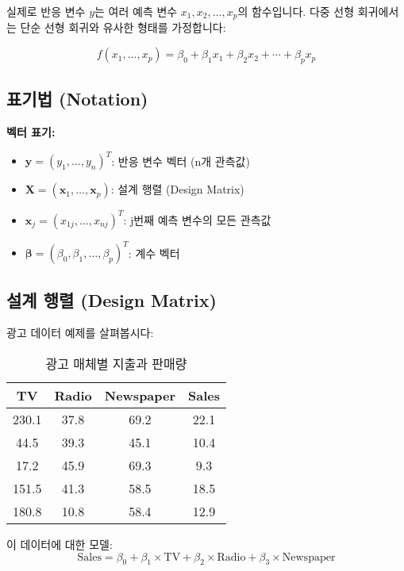 \documentclass[12pt]{article}
\begin{document}
실제로 반응 변수 $y$는 여러 예측 변수 $x_1, x_2, \ldots, x_p$의 함수입니다. 다중 선형 회귀에서는 단순 선형 회귀와 유사한 형태를 가정합니다:

\begin{equation}
f(x_1, \ldots, x_p) = \beta_0 + \beta_1 x_1 + \beta_2 x_2 + \cdots + \beta_p x_p
\end{equation}

\subsection{표기법 (Notation)}

\textbf{벡터 표기:}
\begin{itemize}
    \item $\mathbf{y} = (y_1, \ldots, y_n)^T$: 반응 변수 벡터 (n개 관측값)
    \item $\mathbf{X} = (\mathbf{x}_1, \ldots, \mathbf{x}_p)$: 설계 행렬 (Design Matrix)
    \item $\mathbf{x}_j = (x_{1j}, \ldots, x_{nj})^T$: j번째 예측 변수의 모든 관측값
    \item $\boldsymbol{\beta} = (\beta_0, \beta_1, \ldots, \beta_p)^T$: 계수 벡터
\end{itemize}

\subsection{설계 행렬 (Design Matrix)}

광고 데이터 예제를 살펴봅시다:

\begin{table}[h]
\centering
\begin{tabular}{|c|c|c|c|}
\hline
TV & Radio & Newspaper & Sales \\
\hline
230.1 & 37.8 & 69.2 & 22.1 \\
44.5 & 39.3 & 45.1 & 10.4 \\
17.2 & 45.9 & 69.3 & 9.3 \\
151.5 & 41.3 & 58.5 & 18.5 \\
180.8 & 10.8 & 58.4 & 12.9 \\
\hline
\end{tabular}
\caption{광고 매체별 지출과 판매량}
\end{table}

이 데이터에 대한 모델:
\begin{equation}
\text{Sales} = \beta_0 + \beta_1 \times \text{TV} + \beta_2 \times \text{Radio} + \beta_3 \times \text{Newspaper}
\end{equation}
\end{document}
